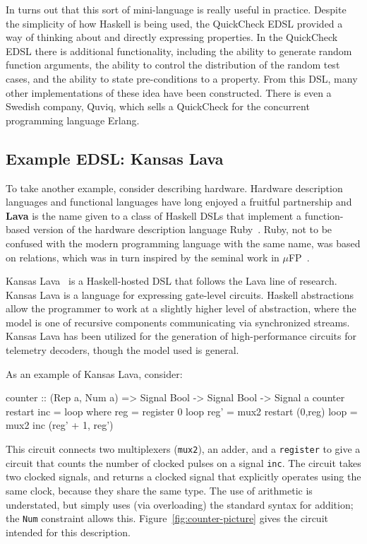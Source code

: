 \documentclass[11pt]{article}
\begin{document}
In turns out that this sort of mini-language is really useful in practice.
Despite the simplicity of how Haskell is being used, the QuickCheck EDSL
provided a way of thinking about and directly expressing properties.
In the QuickCheck EDSL there is additional functionality, including
the ability to generate random function arguments, the ability to control
the distribution of the random test cases, and the ability to state pre-conditions
to a property. From this DSL, many other implementations of
these idea have been constructed. There is even a Swedish company, Quviq,
which sells a QuickCheck for the concurrent programming language Erlang.

\subsection{Example EDSL: Kansas Lava}\label{sec:KansasLava}

To take another example, consider describing hardware.
Hardware description languages and functional languages have
long enjoyed a fruitful partnership and
{\bf Lava} is the name given to a class of Haskell DSLs
that implement a function-based version of the hardware description
language Ruby~\cite{Jones:90:Ruby,Hutton:93:RubyInterp}. Ruby, not to be confused with the
modern programming language with the same name, was based
on relations, which was in turn inspired by
the seminal work in $\mu$FP~\cite{Sheeran:84:muFP}.

Kansas Lava~\cite{Gill:13:TypesKansasLava} is a Haskell-hosted DSL
that follows the Lava line of research.
Kansas Lava is a language for expressing gate-level circuits.
Haskell abstractions allow the programmer to work at
a slightly higher level of abstraction, where the model
is one of recursive components communicating via synchronized streams.
Kansas Lava has been utilized for the generation of high-performance circuits for telemetry decoders,
though the model used is general.

As an example of Kansas Lava, consider:

\begin{Code}

counter :: (Rep a, Num a) => Signal Bool -> Signal Bool -> Signal a
counter restart inc = loop
   where reg = register 0 loop
	 reg' = mux2 restart (0,reg)
	 loop = mux2 inc (reg' + 1, reg')
\end{Code}

This circuit connects two multiplexers (\verb|mux2|),
an adder,
and a \verb|register|
to give a circuit that counts the number of
clocked pulses on a signal \verb|inc|.
The circuit takes two clocked signals,
and returns a clocked signal that explicitly
operates using the same clock, because they
share the same type.
The use of arithmetic is understated,
but simply uses (via overloading) the
standard syntax for addition; the {\tt Num}
constraint allows this.
Figure~\ref{fig:counter-picture} gives the
circuit intended for this description.
\end{document}
